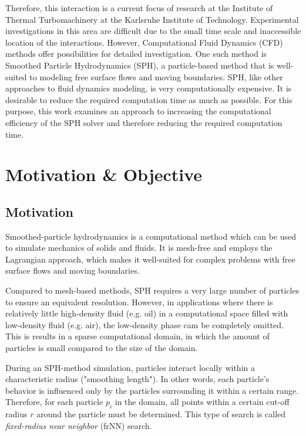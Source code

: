 Therefore, this interaction is a current focus of research at the Institute of Thermal Turbomachinery at the Karlsruhe Institute of Technology.  Experimental investigations in this area are difficult due to the small time scale and inaccessible location of the interactions. However, Computational Fluid Dynamics (CFD) methods offer possibilities for detailed investigation. One such method is Smoothed Particle Hydrodynamics (SPH), a particle-based method that is well-suited to modeling free surface flows and moving boundaries.  SPH, like other approaches to fluid dynamics modeling, is very computationally expensive. It is desirable to reduce the required computation time as much as possible. For this purpose, this work examines an approach to increasing the computational efficiency of the SPH solver and therefore reducing the required computation time. 

\chapter{Motivation \& Objective}

\section{Motivation}
\label{SECTION:Motivation}
Smoothed-particle hydrodynamics is a computational method which can be used to simulate mechanics of solids and fluids.  It is mesh-free and employs the Lagrangian approach, which makes it well-suited for complex problems with free surface flows and moving boundaries.

Compared to mesh-based methods, SPH requires a very large number of particles to ensure an equivalent resolution.  However, in applications where there is relatively little high-density fluid (e.g.  oil) in a computational space filled with low-density fluid (e.g.  air), the low-density phase cam be completely omitted.  This is results in a sparse computational domain, in which the amount of particles is small compared to the size of the domain.

During an SPH-method simulation, particles interact locally within a characteristic radius ("smoothing length").  In other words, each particle's behavior is influenced only by the particles surrounding it within a certain range.  Therefore, for each particle $p_i$ in the domain, all points within a certain cut-off radius $r$ around the particle must be determined.  This type of search is called {\itshape fixed-radius near neighbor} (frNN) search.


